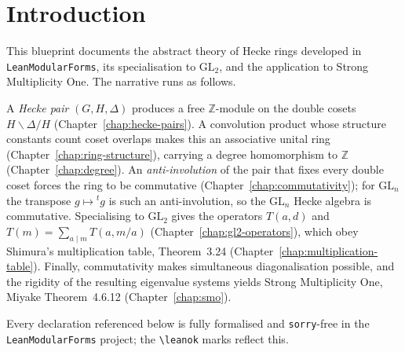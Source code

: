 
\chapter*{Introduction}

This blueprint documents the abstract theory of Hecke rings developed in
\texttt{LeanModularForms}, its specialisation to $\mathrm{GL}_2$, and the application to
Strong Multiplicity One. The narrative runs as follows.

A \emph{Hecke pair} $(G,H,\Delta)$ produces a free $\mathbb{Z}$-module on the double
cosets $H\backslash\Delta/H$ (Chapter~\ref{chap:hecke-pairs}). A convolution product
whose structure constants count coset overlaps makes this an associative unital ring
(Chapter~\ref{chap:ring-structure}), carrying a degree homomorphism to $\mathbb{Z}$
(Chapter~\ref{chap:degree}). An \emph{anti-involution} of the pair that fixes every
double coset forces the ring to be commutative
(Chapter~\ref{chap:commutativity}); for $\mathrm{GL}_n$ the transpose $g\mapsto {}^{t}g$
is such an anti-involution, so the $\mathrm{GL}_n$ Hecke algebra is commutative.
Specialising to $\mathrm{GL}_2$ gives the operators $T(a,d)$ and
$T(m)=\sum_{a\mid m}T(a,m/a)$ (Chapter~\ref{chap:gl2-operators}), which obey Shimura's
multiplication table, Theorem~3.24 (Chapter~\ref{chap:multiplication-table}). Finally,
commutativity makes simultaneous diagonalisation possible, and the rigidity of the
resulting eigenvalue systems yields Strong Multiplicity One, Miyake Theorem~4.6.12
(Chapter~\ref{chap:smo}).

Every declaration referenced below is fully formalised and \texttt{sorry}-free in the
\texttt{LeanModularForms} project; the \texttt{\textbackslash leanok} marks reflect this.








